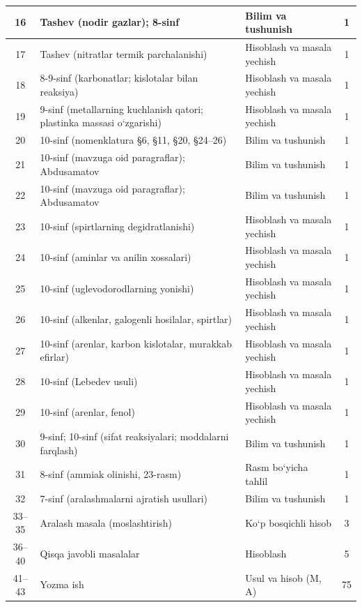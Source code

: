 \documentclass[11pt,a4paper]{article}
\begin{document}
{\begin{longtable}{|c|p{7.2cm}|p{5.4cm}|c|}
16 & Tashev (nodir gazlar); 8-sinf & Bilim va tushunish & 1\\\hline
17 & Tashev (nitratlar termik parchalanishi) & Hisoblash va masala yechish & 1\\\hline
18 & 8-9-sinf (karbonatlar; kislotalar bilan reaksiya) & Hisoblash va masala yechish & 1\\\hline
19 & 9-sinf (metallarning kuchlanish qatori; plastinka massasi o`zgarishi) & Hisoblash va masala yechish & 1\\\hline
20 & 10-sinf (nomenklatura \S{}6, \S{}11, \S{}20, \S{}24--26) & Bilim va tushunish & 1\\\hline
21 & 10-sinf (mavzuga oid paragraflar); Abdusamatov & Bilim va tushunish & 1\\\hline
22 & 10-sinf (mavzuga oid paragraflar); Abdusamatov & Bilim va tushunish & 1\\\hline
23 & 10-sinf (spirtlarning degidratlanishi) & Hisoblash va masala yechish & 1\\\hline
24 & 10-sinf (aminlar va anilin xossalari) & Hisoblash va masala yechish & 1\\\hline
25 & 10-sinf (uglevodorodlarning yonishi) & Hisoblash va masala yechish & 1\\\hline
26 & 10-sinf (alkenlar, galogenli hosilalar, spirtlar) & Hisoblash va masala yechish & 1\\\hline
27 & 10-sinf (arenlar, karbon kislotalar, murakkab efirlar) & Hisoblash va masala yechish & 1\\\hline
28 & 10-sinf (Lebedev usuli) & Hisoblash va masala yechish & 1\\\hline
29 & 10-sinf (arenlar, fenol) & Hisoblash va masala yechish & 1\\\hline
30 & 9-sinf; 10-sinf (sifat reaksiyalari; moddalarni farqlash) & Bilim va tushunish & 1\\\hline
31 & 8-sinf (ammiak olinishi, 23-rasm) & Rasm bo`yicha tahlil & 1\\\hline
32 & 7-sinf (aralashmalarni ajratish usullari) & Bilim va tushunish & 1\\\hline
33--35 & Aralash masala (moslashtirish) & Ko`p bosqichli hisob & 3\\\hline
36--40 & Qisqa javobli masalalar & Hisoblash & 5\\\hline
41--43 & Yozma ish & Usul va hisob (M, A) & 75\\\hline
\end{longtable}}
\end{document}
